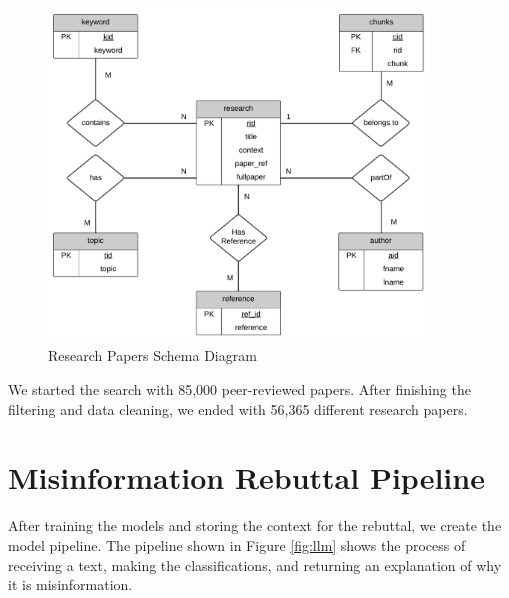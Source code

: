 \begin{figure}[H]
	\begin{center}
		\includegraphics[width=0.9\textwidth]{images/Table_diagram.png} %
	\end{center}
	\caption{Research Papers Schema Diagram} %
	\label{fig:table}
\end{figure}


We started the search with 85,000 peer-reviewed papers. After finishing the filtering and data cleaning, we ended with 56,365 different research papers. 



\section{Misinformation Rebuttal Pipeline}
After training the models and storing the context for the rebuttal, we create the model pipeline. The pipeline shown in Figure \ref{fig:llm} shows the process of receiving a text, making the classifications, and returning an explanation of why it is misinformation.

